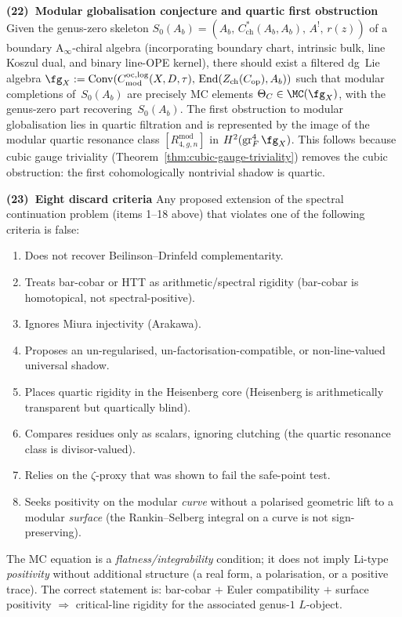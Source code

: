 \smallskip\noindent
\textbf{(22)~Modular globalisation conjecture and quartic first obstruction}%
\label{item:concordance-modular-globalisation}%
%
%
\ClaimStatusConjectured{}
Given the genus-zero skeleton
$S_0(A_b) = (A_b,\, C^*_{\mathrm{ch}}(A_b, A_b),\, A^!,\,
 r(z))$
of a boundary A$_\infty$-chiral algebra (incorporating
boundary chart, intrinsic bulk, line Koszul dual, and binary
line-OPE kernel), there should exist a filtered dg~Lie algebra
$\fg_X := \operatorname{Conv}(C^{\mathrm{oc,log}}_{\mathrm{mod}}
(X,D,\tau),\, \operatorname{End}(Z_{\mathrm{ch}}(C_{\mathrm{op}}),
A_b))$
such that modular completions of~$S_0(A_b)$ are precisely
MC elements $\Theta_C \in \MC(\fg_X)$, with the genus-zero part
recovering~$S_0(A_b)$. The first obstruction to modular
globalisation lies in quartic filtration and is represented by
the image of the modular quartic resonance class
$[R^{\mathrm{mod}}_{4,g,n}]$ in
$H^2(\operatorname{gr}^4_F \fg_X)$. This follows because cubic
gauge triviality
(Theorem~\textup{\ref{thm:cubic-gauge-triviality}})
removes the cubic obstruction: the first cohomologically
nontrivial shadow is quartic.

\smallskip\noindent
\textbf{(23)~Eight discard criteria}%
\label{item:concordance-discard-criteria}%
%
Any proposed extension of the spectral continuation problem
\textup{(}items 1--18 above\textup{)} that violates one of the
following criteria is false:
\begin{enumerate}[label=\textup{(D\arabic*)},nosep]
\item Does not recover Beilinson--Drinfeld complementarity.
\item Treats bar-cobar or HTT as arithmetic/spectral rigidity
 (bar-cobar is homotopical, not spectral-positive).
\item Ignores Miura injectivity (Arakawa).
\item Proposes an un-regularised, un-factorisation-compatible,
 or non-line-valued universal shadow.
\item Places quartic rigidity in the Heisenberg core
 (Heisenberg is arithmetically transparent but quartically blind).
\item Compares residues only as scalars, ignoring clutching
 (the quartic resonance class is divisor-valued).
\item Relies on the $\zeta$-proxy that was shown to fail
 the safe-point test.
\item Seeks positivity on the modular \emph{curve} without
 a polarised geometric lift to a modular \emph{surface}
 (the Rankin--Selberg integral on a curve is not
 sign-preserving).
\end{enumerate}
The MC equation is a
\emph{flatness/integrability} condition; it does not imply
Li-type \emph{positivity} without additional structure
(a real form, a polarisation, or a positive trace).
The correct statement is: bar-cobar $+$ Euler compatibility
$+$ surface positivity $\Rightarrow$ critical-line rigidity
for the associated genus-$1$ $L$-object.

